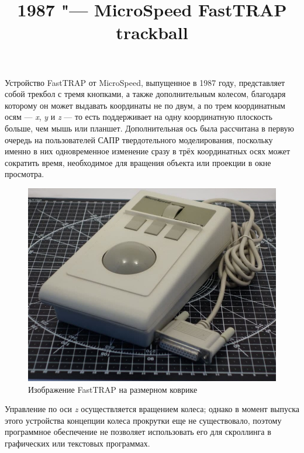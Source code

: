 \documentclass[11pt, a4paper]{article}
\begin{document}
\title{1987 "--- MicroSpeed FastTRAP trackball}
\date{}
\maketitle

Устройство FastTRAP от MicroSpeed, выпущенное в 1987 году, представляет собой трекбол с тремя кнопками, а также дополнительным колесом, благодаря которому он может выдавать координаты не по двум, а по трем координатным осям  — \textit{x}, \textit{y} и \textit{z} — то есть поддерживает на одну координатную плоскость больше, чем мышь или планшет. Дополнительная ось была рассчитана в первую очередь на пользователей САПР твердотельного моделирования, поскольку именно в них одновременное изменение сразу в трёх координатных осях может сократить время, необходимое для вращения объекта или проекции в окне просмотра.

\begin{figure}[h]
   \centering
    \includegraphics[scale=0.3]{1987_microspeed_fasttrap/fast.jpg}
    \caption{Изображение FastTRAP  на размерном коврике}
    \label{fig:FastTRAPSize}
\end{figure}

Управление по оси \textit{z} осуществляется вращением колеса; однако в момент выпуска этого устройства концепции колеса прокрутки еще не существовало, поэтому программное обеспечение не позволяет использовать его для скроллинга в графических или текстовых программах.
\end{document}
